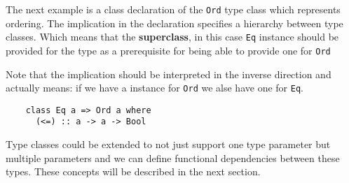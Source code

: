 The next example is a class declaration of the \texttt{Ord} type class which
represents ordering. The implication in the declaration specifies a hierarchy
between type classes. Which means that the \textbf{superclass}, in this case
\texttt{Eq} instance should be provided for the type as a prerequisite for being
able to provide one for \texttt{Ord}

Note that the implication should be interpreted in the inverse direction and
actually means: if we have a instance for \texttt{Ord} we alse have one for
\texttt{Eq}.
\begin{verbatim}
    class Eq a => Ord a where
      (<=) :: a -> a -> Bool
\end{verbatim}

Type classes could be extended to not just support one type parameter but
multiple parameters and we can define functional dependencies between these
types. These concepts will be described in the next section.
